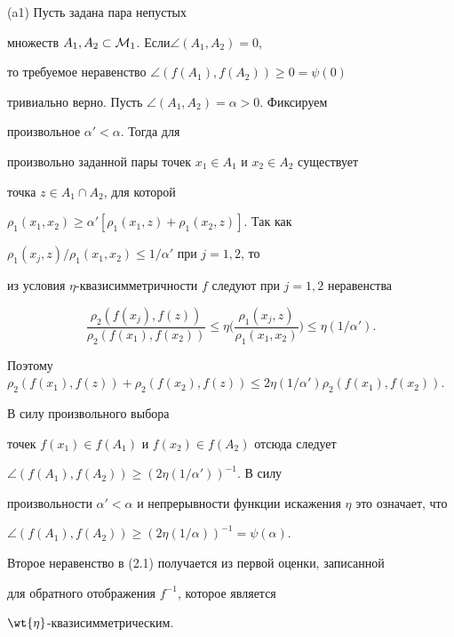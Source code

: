 \begin{pf}


(a1) Пусть задана пара непустых 


множеств $A_1, A_2 \subset {\cal M}_1$. Если\linebreak $\angle(A_1, A_2)=0$, 


то требуемое неравенство $\angle(f(A_1), f(A_2)) \geq 0=\psi(0)$ 


тривиально верно. Пусть $\angle(A_1, A_2)=\alpha >0 $. Фиксируем 


произвольное $\alpha' < \alpha$. Тогда для 


произвольно заданной пары точек $x_1\in A_1$ и $x_2 \in A_2$ существует 


точка $z\in A_1\cap A_2$, для которой 


$\rho_1(x_1, x_2) \geq 


\alpha'[\rho_1(x_1, z)+\rho_1(x_2, z)]$. Так как 


$\rho_1(x_j, z)/\rho_1(x_1,x_2) \leq 1/\alpha'$ при $j=1,2$, то 


из условия $\eta$-{}квазисимметричности $f$ следуют при $j=1,2$ неравенства


$$


\frac{\rho_2(f(x_j), f(z))}{\rho_2(f(x_1), f(x_2))} \leq \eta \bigg( 


\frac{\rho_1(x_j, z)}{\rho_1(x_1, x_2)} \bigg) \leq \eta(1/\alpha').


$$ 


Поэтому $ \rho_2(f(x_1), f(z))+\rho_2(f(x_2), f(z)) \leq 


2\eta(1/\alpha')\rho_2(f(x_1), f(x_2))$. 


В силу произвольного выбора 


точек $f(x_1) \in f(A_1)$ и $f(x_2) \in f(A_2)$ отсюда следует


$\angle(f(A_1), f(A_2)) \geq (2\eta(1/\alpha'))^{-1}$. В силу 


произвольности $\alpha' 


< \alpha$ и непрерывности функции искажения $\eta$ это означает, что 


$\angle(f(A_1), f(A_2)) \geq (2\eta(1/\alpha))^{-1}=\psi(\alpha)$. 


Второе неравенство в (2.1) получается из первой оценки, записанной 


для обратного отображения $f^{-1}$, которое является 


$\wt{\eta}$-{}квазисимметрическим.






\end{pf}
